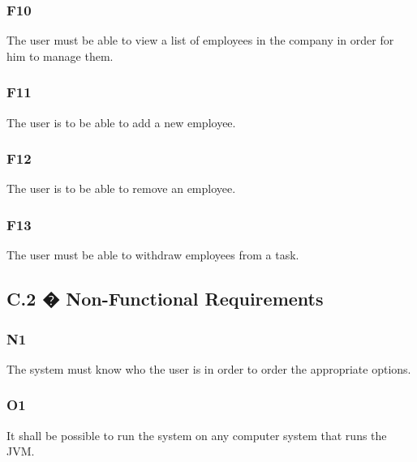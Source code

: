 \documentclass[12pt]{article}
\begin{document}
\subsubsection{F10}
{
The user must be able to view a list of employees in the company in order for him to manage them.
}
\subsubsection{F11}
{
The user is to be able to add a new employee.
}
\subsubsection{F12}
{
The user is to be able to remove an employee.
}
\subsubsection{F13}                                                                         
{
The user must be able to withdraw employees from a task.
}
\subsection{C.2 � Non-Functional Requirements}
\subsubsection{N1}
{
The system must know who the user is in order to order the appropriate options.
}
\subsubsection{O1}
{
It shall be possible to run the system on any computer system that runs the JVM.
}
\end{document}

